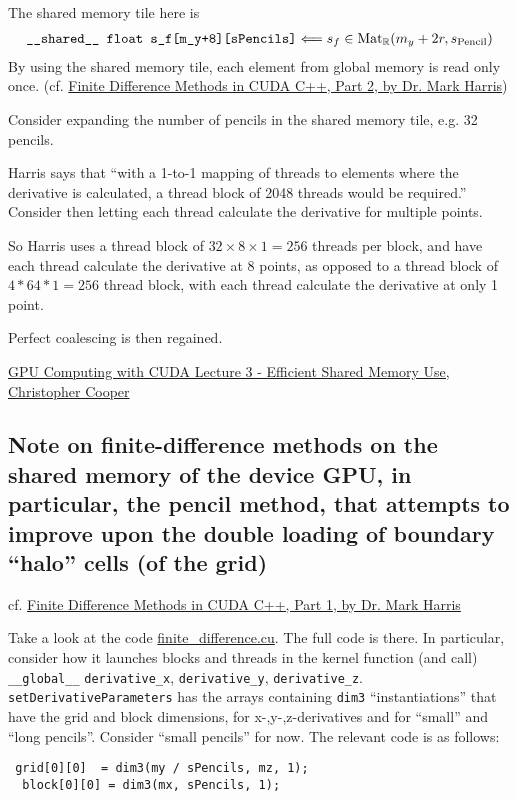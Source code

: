 \documentclass[10pt]{amsart}
\begin{document}
\begin{multicols*}{2}
The shared memory tile here is
\[
\begin{gathered}
\verb|__shared__ float s_f[m_y+8][sPencils]| \Longleftarrow s_f \in \text{Mat}_{\mathbb{R}}(m_y+2r, s_{\text{Pencil}})
  \end{gathered}
\]
By using the shared memory tile, each element from global memory is read only once. (cf. \href{https://devblogs.nvidia.com/parallelforall/finite-difference-methods-cuda-c-part-2/}{Finite Difference Methods in CUDA C++, Part 2, by Dr. Mark Harris}) 

Consider expanding the number of pencils in the shared memory tile, e.g. 32 pencils.

Harris says that ``with a 1-to-1 mapping of threads to elements where the derivative is calculated, a thread block of 2048 threads would be required.''  Consider then letting each thread calculate the derivative for multiple points.  

So Harris uses a thread block of $32\times 8 \times 1 = 256$ threads per block, and have each thread calculate the derivative at 8 points, as opposed to a thread block of $4*64*1=256$ thread block, with each thread calculate the derivative at only 1 point.

Perfect coalescing is then regained.





\href{http://www.bu.edu/pasi/files/2011/07/Lecture31.pdf}{GPU Computing with CUDA
Lecture 3 - Efficient Shared Memory Use, Christopher Cooper}

\pagebreak

\subsection{Note on finite-difference methods on the shared memory of the device GPU, in particular, the pencil method, that attempts to improve upon the double loading of boundary ``halo'' cells (of the grid)}

cf. \href{https://devblogs.nvidia.com/parallelforall/finite-difference-methods-cuda-c-part-1/}{Finite Difference Methods in CUDA C++, Part 1, by Dr. Mark Harris}

Take a look at the code \href{https://github.com/parallel-forall/code-samples/blob/master/series/cuda-cpp/finite-difference/finite-difference.cu}{finite\_difference.cu}.  The full code is there.  In particular, consider how it launches blocks and threads in the kernel function (and call) \verb|__global__| \verb|derivative_x|, \verb|derivative_y|, \verb|derivative_z|.  \verb|setDerivativeParameters| has the arrays containing \verb|dim3| ``instantiations'' that have the grid and block dimensions, for x-,y-,z-derivatives and for ``small'' and ``long pencils''.  Consider ``small pencils'' for now.  The relevant code is as follows:
\begin{lstlisting}
 grid[0][0]  = dim3(my / sPencils, mz, 1);
  block[0][0] = dim3(mx, sPencils, 1);


\end{lstlisting}
\end{multicols*}
\end{document}
